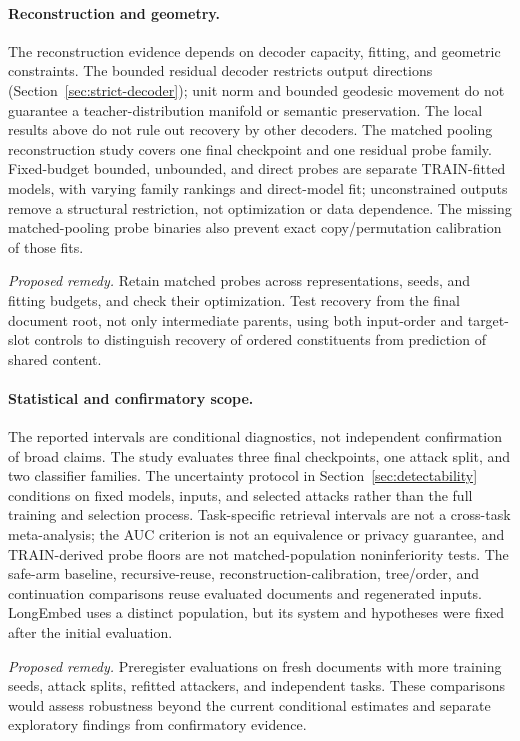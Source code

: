 \documentclass[10pt]{article}
\begin{document}
\paragraph{Reconstruction and geometry.}
The reconstruction evidence depends on decoder capacity, fitting, and geometric constraints.
The bounded residual decoder restricts output directions
(Section~\ref{sec:strict-decoder}); unit norm and bounded geodesic movement do
not guarantee a teacher-distribution manifold or semantic preservation. The
local results above do not rule out recovery by other decoders. The matched
pooling reconstruction study covers one final checkpoint and one residual
probe family. Fixed-budget bounded, unbounded, and direct probes are separate
TRAIN-fitted models, with varying family rankings and direct-model fit;
unconstrained outputs remove a structural restriction, not optimization or
data dependence. The missing matched-pooling probe binaries also prevent exact
copy/permutation calibration of those fits.

\emph{Proposed remedy.} Retain matched probes across representations,
seeds, and fitting budgets, and check their optimization. Test recovery from
the final document root, not only intermediate parents, using both input-order
and target-slot controls to distinguish recovery of ordered constituents from
prediction of shared content.

\paragraph{Statistical and confirmatory scope.}
The reported intervals are conditional diagnostics, not independent confirmation of broad claims.
The study evaluates three final checkpoints, one attack split, and two
classifier families. The uncertainty protocol in
Section~\ref{sec:detectability} conditions on fixed models, inputs, and selected
attacks rather than the full training and selection process. Task-specific
retrieval intervals are not a cross-task meta-analysis; the AUC criterion is
not an equivalence or privacy guarantee, and TRAIN-derived probe floors are
not matched-population noninferiority tests.
The safe-arm baseline, recursive-reuse, reconstruction-calibration, tree/order,
and continuation comparisons reuse evaluated documents and regenerated inputs.
LongEmbed uses a distinct population, but its system and hypotheses were fixed
after the initial evaluation.

\emph{Proposed remedy.} Preregister evaluations on fresh documents with
more training seeds, attack splits, refitted attackers, and independent tasks.
These comparisons would assess robustness beyond the current conditional
estimates and separate exploratory findings from confirmatory evidence.
\end{document}
